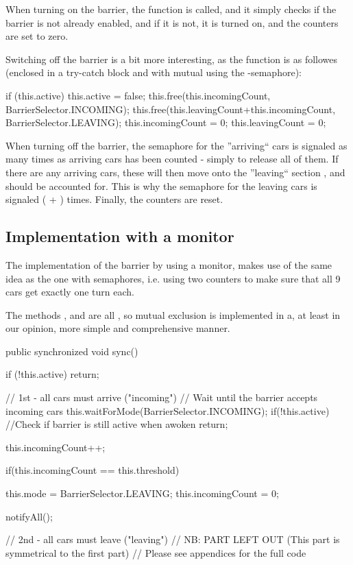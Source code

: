 When turning on the barrier, the function  is called, and it simply checks if the barrier is not already enabled, and if it is not, it is turned on, and the counters are set to zero.

Switching off the barrier is a bit more interesting, as the function  is as followes (enclosed in a try-catch block and with mutual using the -semaphore):

\begin{java}
	if (this.active) {
	this.active = false;
	this.free(this.incomingCount, BarrierSelector.INCOMING);
	this.free(this.leavingCount+this.incomingCount, BarrierSelector.LEAVING);
	this.incomingCount = 0;
	this.leavingCount = 0;
}
\end{java}

When turning off the barrier, the semaphore for the ''arriving`` cars is signaled as many times as arriving cars has been counted - simply to release all of them. If there are any arriving cars, these will then move onto the ''leaving`` section , and should be accounted for. This is why the semaphore for the leaving cars is signaled ( + ) times. Finally, the counters are reset.

\subsection{Implementation with a monitor}
\label{sub:bar-moni}
The implementation of the barrier by using a monitor, makes use of the same idea as the one with semaphores, i.e. using two counters to make sure that all 9 cars get exactly one turn each.

The methods ,  and  are all , so mutual exclusion is implemented in a, at least in our opinion, more simple and comprehensive manner.

\begin{java}
public synchronized void sync() {
	if (!this.active)
		return;

	// 1st - all cars must arrive ("incoming")
	// Wait until the barrier accepts incoming cars
	this.waitForMode(BarrierSelector.INCOMING);
	if(!this.active) //Check if barrier is still active when awoken
		return;

	this.incomingCount++;

	if(this.incomingCount == this.threshold) {
		this.mode = BarrierSelector.LEAVING;
		this.incomingCount = 0;

		notifyAll();
	}
	// 2nd - all cars must leave ("leaving")
	// NB: PART LEFT OUT (This part is symmetrical to the first part)
	// Please see appendices for the full code
}
\end{java}

